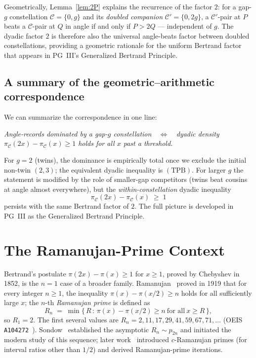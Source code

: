 \documentclass[11pt]{article}
\begin{document}
Geometrically, Lemma~\ref{lem:2P} explains the recurrence of the
factor $2$: for a gap-$g$ constellation $\mathcal{C} = \{0, g\}$ and
its \emph{doubled companion} $\mathcal{C}' = \{0, 2g\}$, a
$\mathcal{C}'$-pair at $P$ beats a $\mathcal{C}$-pair at $Q$ in
angle if and only if $P > 2Q$ --- independent of $g$. The dyadic
factor $2$ is therefore also the universal angle-beats factor
between doubled constellations, providing a geometric rationale for
the uniform Bertrand factor that appears in PG~III's Generalized
Bertrand Principle.

\subsection{A summary of the geometric--arithmetic correspondence}

We can summarize the correspondence in one line:

\begin{center}
\emph{Angle-records dominated by a gap-$g$ constellation~~$\iff$~~dyadic
density $\pi_{\mathcal{C}}(2x) - \pi_{\mathcal{C}}(x) \ge 1$ holds
for all $x$ past a threshold.}
\end{center}

For $g = 2$ (twins), the dominance is empirically total once we exclude
the initial non-twin $(2,3)$; the equivalent dyadic inequality is
$(\mathrm{TPB})$. For larger $g$ the statement is modified by the
role of smaller-gap competitors (twins beat cousins at angle
almost everywhere), but the \emph{within-constellation} dyadic
inequality
\[
\pi_{\mathcal{C}}(2x) - \pi_{\mathcal{C}}(x) \;\ge\; 1
\]
persists with the same Bertrand factor of $2$. The full picture
is developed in PG~III as the Generalized Bertrand Principle.

\section{The Ramanujan-Prime Context}

Bertrand's postulate $\pi(2x) - \pi(x) \ge 1$ for $x \ge 1$,
proved by Chebyshev in 1852, is the $n = 1$ case of a broader family.
Ramanujan~\cite{Ramanujan1919} proved in 1919 that for every integer
$n \ge 1$, the inequality
$\pi(x) - \pi(x/2) \ge n$ holds for all sufficiently large $x$; the
$n$-th \emph{Ramanujan prime} is defined as
\begin{equation}\label{eq:Rn-classical}
R_n \;=\; \min\Big\{\,R\,:\,\pi(x) - \pi(x/2) \ge n\ \text{for all}\ x \ge R\,\Big\},
\end{equation}
so $R_1 = 2$. The first several values are $R_n = 2, 11, 17, 29,
41, 59, 67, 71, \ldots$ (OEIS \texttt{A104272}~\cite{OEIS_A104272}).
Sondow~\cite{Sondow2009} established the asymptotic
$R_n \sim p_{2n}$ and initiated the modern study of this sequence;
later work~\cite{Amersi2014, Paksoy2012} introduced
$c$-Ramanujan primes (for interval ratios other than $1/2$) and
derived Ramanujan-prime iterations.
\end{document}
